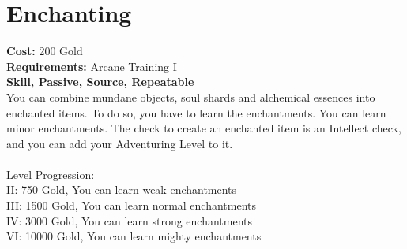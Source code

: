 \section*{Enchanting}
\textbf{Cost:} 200 Gold\\
\textbf{Requirements:} Arcane Training I\\
\textbf{Skill, Passive, Source, Repeatable}\\
You can combine mundane objects, soul shards and alchemical essences into enchanted items. To do so, you have to learn the enchantments. You can learn minor enchantments. The check to create an enchanted item is an Intellect check, and you can add your Adventuring Level to it.\\
\\
Level Progression:\\
II: 750 Gold, You can learn weak enchantments\\
III: 1500 Gold, You can learn normal enchantments\\
IV: 3000 Gold, You can learn strong enchantments\\
VI: 10000 Gold, You can learn mighty enchantments\\